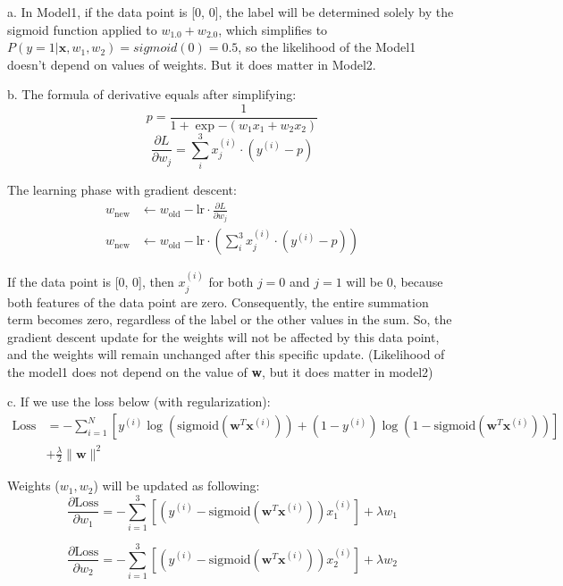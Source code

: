 \documentclass{article}
\begin{document}
a. In Model1, if the data point is [0, 0], the label will be determined solely by the sigmoid function applied to $w_1.0 + w_2.0$, which simplifies to $P(y = 1 | \mathbf{x}, w_1, w_2) = sigmoid(0) = 0.5$, so the likelihood of the Model1 doesn't depend on values of weights. But it does matter in Model2.

\bigskip
\hrulefill
\bigskip

b. The formula of derivative equals after simplifying:
\[
p = \frac{1}{1 + \exp{-(w_1x_1 + w_2x_2)}}
\]
\[
\frac{\partial L}{\partial w_j} = \sum_{i}^{3} x_j^{(i)} \cdot (y^{(i)} - p)
\]

The learning phase with gradient descent:\\
\[
\begin{aligned}
w_{\text{new}} &\leftarrow w_{\text{old}} - \text{lr} \cdot \frac{\partial L}{\partial w_j} \\
w_{\text{new}} &\leftarrow w_{\text{old}} - \text{lr} \cdot \left(\sum_{i}^{3} x_j^{(i)} \cdot \left(y^{(i)} - p\right)\right)
\end{aligned}
\]

If the data point is [0, 0], then $x_j^{(i)}$ for both $j=0$ and $j=1$ will be 0, because both features of the data point are zero. Consequently, the entire summation term becomes zero, regardless of the label or the other values in the sum. So, the gradient descent update for the weights will not be affected by this data point, and the weights will remain unchanged after this specific update. (Likelihood of the model1 does not depend on the value of \textbf{w}, but it does matter in model2)

\bigskip
\hrulefill
\bigskip

c. If we use the loss below (with regularization):
\[
\begin{aligned}
\text{Loss} &= -\sum_{i=1}^N \left[ y^{(i)} \log(\text{sigmoid}(\mathbf{w}^T \mathbf{x}^{(i)})) + (1 - y^{(i)}) \log(1 - \text{sigmoid}(\mathbf{w}^T \mathbf{x}^{(i)})) \right] \\ &+ \frac{\lambda}{2} \|\mathbf{w}\|^2
\end{aligned}
\]

\pagebreak

Weights ($w_1, w_2$) will be updated as following:
\[
\frac{\partial \text{Loss}}{\partial w_1} = -\sum_{i=1}^3 \left[ (y^{(i)} - \text{sigmoid}(\mathbf{w}^T \mathbf{x}^{(i)}))x_1^{(i)} \right] + \lambda w_1
\]

\[
\frac{\partial \text{Loss}}{\partial w_2} = -\sum_{i=1}^3 \left[ (y^{(i)} - \text{sigmoid}(\mathbf{w}^T \mathbf{x}^{(i)}))x_2^{(i)} \right] + \lambda w_2
\]
\end{document}
